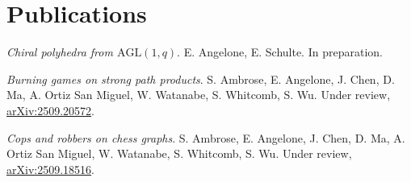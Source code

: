 \section*{Publications}
	\textit{Chiral polyhedra from $\mathrm{AGL}(1, q)$}. E. Angelone, E. Schulte. In preparation.
	
	\textit{Burning games on strong path products}. S. Ambrose, E. Angelone, J. Chen, D. Ma, A. Ortiz San Miguel, W. Watanabe, S. Whitcomb, S. Wu. Under review, \href{https://arxiv.org/abs/2509.20572}{arXiv:2509.20572}.
	
	\textit{Cops and robbers on chess graphs}. S. Ambrose, E. Angelone, J. Chen, D. Ma, A. Ortiz San Miguel, W. Watanabe, S. Whitcomb, S. Wu. Under review, \href{https://arxiv.org/abs/2509.18516}{arXiv:2509.18516}.